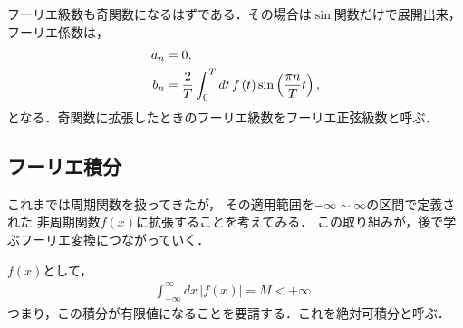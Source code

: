 フーリエ級数も奇関数になるはずである．その場合は$\sin$関数だけで展開出来，
フーリエ係数は，
\begin{align}
  a_n & = 0, \notag \\
  b_n & = \dfrac{2}{T}\int_{0}^{T}dt\,f\left(t\right) \sin\left(\dfrac{\pi n}{T}t\right),
\end{align}
となる．奇関数に拡張したときのフーリエ級数をフーリエ正弦級数と呼ぶ．
%
%
%

\subsection{フーリエ積分}
%
これまでは周期関数を扱ってきたが，
その適用範囲を$-\infty\sim \infty$の区間で定義された
非周期関数$f(x)$に拡張することを考えてみる．
この取り組みが，後で学ぶフーリエ変換につながっていく．

$f(x)$として，
\begin{align}
 \int_{-\infty}^{\infty}dx\,\left|f\left(x\right)\right| = M < + \infty, 
\end{align}
つまり，この積分が有限値になることを要請する．これを絶対可積分と呼ぶ．

